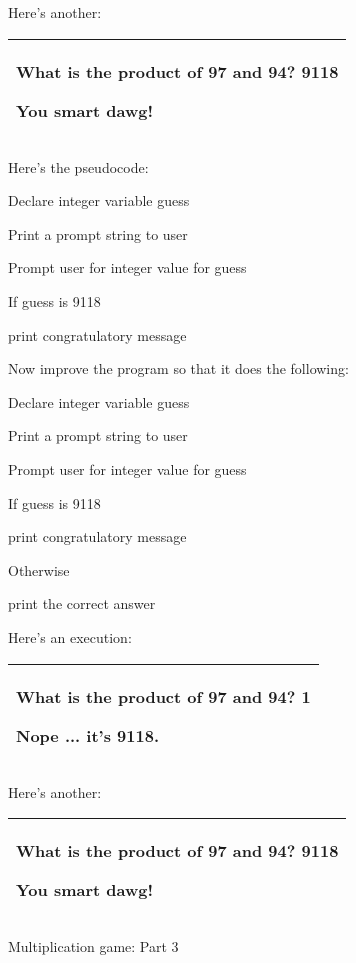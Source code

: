 \documentclass[
]{article}
\begin{document}
Here's another:

\begin{longtable}[]{@{}l@{}}
\toprule
\endhead
\begin{minipage}[t]{0.97\columnwidth}\raggedright
What is the product of 97 and 94? \textbf{9118}

You smart dawg!\strut
\end{minipage}\tabularnewline
\bottomrule
\end{longtable}

Here's the pseudocode:

Declare integer variable guess

Print a prompt string to user

Prompt user for integer value for guess

If guess is 9118

print congratulatory message

Now improve the program so that it does the following:

Declare integer variable guess

Print a prompt string to user

Prompt user for integer value for guess

If guess is 9118

print congratulatory message

Otherwise

print the correct answer

Here's an execution:

\begin{longtable}[]{@{}l@{}}
\toprule
\endhead
\begin{minipage}[t]{0.97\columnwidth}\raggedright
What is the product of 97 and 94? \textbf{1}

Nope ... it's 9118.\strut
\end{minipage}\tabularnewline
\bottomrule
\end{longtable}

Here's another:

\begin{longtable}[]{@{}l@{}}
\toprule
\endhead
\begin{minipage}[t]{0.97\columnwidth}\raggedright
What is the product of 97 and 94? \textbf{9118}

You smart dawg!\strut
\end{minipage}\tabularnewline
\bottomrule
\end{longtable}

Multiplication game: Part 3
\end{document}
